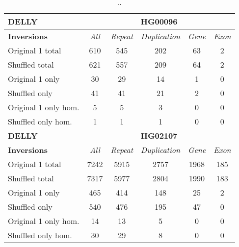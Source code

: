 \begin{table}[htb]
\caption{ .. }
\begin{center}
\begin{tabular}{|l|c||c|c|c|c|}
\hline
{\bf DELLY} & \multicolumn{5}{|c|}{\bf HG00096} \\
\hline
\cline{2-6}
{\bf Inversions} & {\it All} & {\it Repeat} & {\it Duplication} & {\it Gene} & {\it Exon} \\
\hline
Original 1 total & 610 & 545 & 202 & 63 & 2\\ 
\hline
Shuffled total & 621 & 557 & 209 & 64 & 2\\ 
\hline
Original 1 only & 30 & 29 & 14 & 1 & 0\\ 
\hline
Shuffled only & 41 & 41 & 21 & 2 & 0\\ 
\hline
Original 1 only hom. & 5 & 5 & 3 & 0 & 0\\ 
\hline
Shuffled only hom. & 1 & 1 & 1 & 0 & 0\\ 
\hline
\hline
{\bf DELLY} & \multicolumn{5}{|c|}{\bf HG02107} \\
\hline
\cline{2-6}
{\bf Inversions} & {\it All} & {\it Repeat} & {\it Duplication} & {\it Gene} & {\it Exon} \\
\hline
Original 1 total & 7242 & 5915 & 2757 & 1968 & 185\\ 
\hline
Shuffled total & 7317 & 5977 & 2804 & 1990 & 183\\ 
\hline
Original 1 only & 465 & 414 & 148 & 25 & 2\\ 
\hline
Shuffled only & 540 & 476 & 195 & 47 & 0\\ 
\hline
Original 1 only hom. & 14 & 13 & 5 & 0 & 0\\ 
\hline
Shuffled only hom. & 30 & 29 & 8 & 0 & 0\\ 
\hline
\end{tabular}
\end{center}
\label{tab:orig-vs-shuf-delly-inv}
\end{table}

